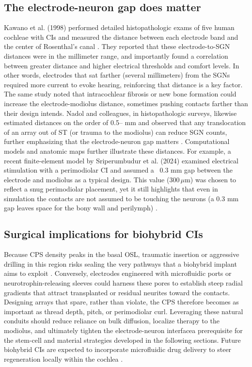 \documentclass[referee,pdflatex, sn-vancouver-num]{sn-jnl}%
\theoremstyle{thmstyleone}%
\theoremstyle{thmstyletwo}%
\theoremstyle{thmstylethree}%
\newcommand{\um}{\ensuremath{\,\mu\mathrm{m}}}
\DeclareRobustCommand{\textendash}{\ifmmode\text{-}\else\leavevmode\hbox{--}\fi}
\begin{document}
\subsection{The electrode-neuron gap does matter}
Kawano et al. (1998) performed detailed histopathologic exams of five human cochleae with CIs and measured the distance between each electrode band and the center of Rosenthal's canal \cite{Kawano1998}. They reported that these electrode-to-SGN distances were in the millimeter range, and importantly found a correlation between greater distance and higher electrical thresholds and comfort levels. In other words, electrodes that sat farther (several millimeters) from the SGNs required more current to evoke hearing, reinforcing that distance is a key factor. The same study noted that intracochlear fibrosis or new bone formation could increase the electrode-modiolus distance, sometimes pushing contacts farther than their design intends. Nadol and colleagues, in histopathologic surveys, likewise estimated distances on the order of 0.5\textendash 2 mm and observed that any translocation of an array out of ST (or trauma to the modiolus) can reduce SGN counts, further emphasizing that the electrode-neuron gap matters \cite{nadol1990,Nadol1989}. Computational models and anatomic maps further illustrate these distances. For example, a recent finite-element model by Sriperumbudur et al. (2024) examined electrical stimulation with a perimodiolar CI and assumed a ~0.3 mm gap between the electrode and modiolus as a typical design. This value ($300{\um}$) was chosen to reflect a snug perimodiolar placement, yet it still highlights that even in simulation the contacts are not assumed to be touching the neurons (a 0.3 mm gap leaves space for the bony wall and perilymph) \cite{Sriperumbudur2024}. 

\subsection{Surgical implications for biohybrid CIs}  
Because CPS density peaks in the basal OSL, traumatic insertion or aggressive drilling in this region risks sealing the very pathways that a biohybrid implant aims to exploit \cite{shepherd2004}.  Conversely, electrodes engineered with microfluidic ports or neurotrophin-releasing sleeves could harness these pores to establish steep radial gradients that attract transplanted or residual neurites toward the contacts.  Designing arrays that spare, rather than violate, the CPS therefore becomes as important as thread depth, pitch, or perimodiolar curl.  Leveraging these natural conduits should reduce reliance on bulk diffusion, localize therapy to the modiolus, and ultimately tighten the electrode-neuron interface\textemdash a prerequisite for the stem-cell and material strategies developed in the following sections. Future biohybrid CIs are expected to incorporate microfluidic drug delivery to steer regeneration locally within the cochlea \cite{Carnicer-Lombarte:2025aa}.
\end{document}
